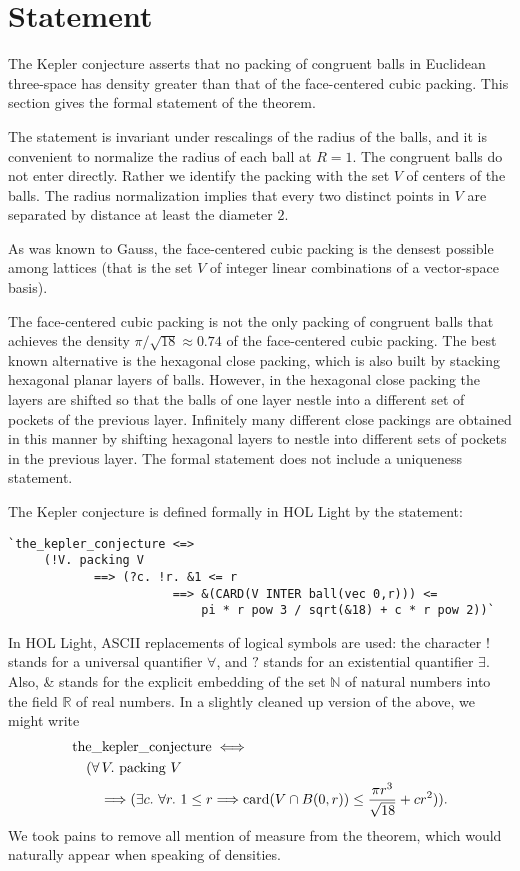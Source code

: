 \documentclass{amsart}
\newcommand{\ring}[1]{\mathbb{#1}}
\newcommand{\op}[1]{\hbox{#1}}
\begin{document}


\section{Statement}

The Kepler conjecture asserts that no packing of congruent balls in
Euclidean three-space has density greater than that of the
face-centered cubic packing.  This section gives the formal statement
of the theorem.

The statement is invariant under rescalings of the radius of the balls,
and it is convenient to normalize the radius of each ball at $R=1$.
The congruent balls do not enter directly. Rather we identify the packing
with the set $V$ of centers of the balls.  The radius normalization implies
that every two distinct points in $V$ are separated by distance at least
the diameter $2$.

As was known to Gauss, the face-centered cubic packing is the densest
possible among lattices (that is the set $V$ of integer linear
combinations of a vector-space basis).

The face-centered cubic packing is not the only packing of congruent
balls that achieves the density $\pi/\sqrt{18} \approx 0.74$ of the
face-centered cubic packing.  The best known alternative is the
hexagonal close packing, which is also built by stacking hexagonal
planar layers of balls.  However, in the hexagonal close packing the
layers are shifted so that the balls of one layer nestle into a different
set of pockets of the previous layer.  Infinitely many different
close packings are obtained in this manner by shifting hexagonal
layers to nestle into different sets of pockets in the previous
layer.  The formal statement does not include a uniqueness statement.

The Kepler conjecture is defined formally in HOL Light by the statement:
\begin{verbatim}
`the_kepler_conjecture <=>
     (!V. packing V
            ==> (?c. !r. &1 <= r
                       ==> &(CARD(V INTER ball(vec 0,r))) <=
                           pi * r pow 3 / sqrt(&18) + c * r pow 2))`
\end{verbatim}
In HOL Light, ASCII replacements of logical symbols are used:
the character $!$ stands for a universal quantifier $\forall$,
and $?$ stands for an existential quantifier $\exists$.
Also, \& stands for the explicit embedding of the set $\ring{N}$ of natural
numbers into the field $\ring{R}$ of real numbers.  In a slightly
cleaned up version of the above, we might write
\begin{align*}
&\op{the\_kepler\_conjecture} \iff\\
&\quad (\forall\, V.\ \op{packing}\ V\\
&\quad\quad \Longrightarrow (\exists c.\ \forall r.\ 1 \le r \Longrightarrow
\op{card}(V \cap B(0,r)) \le
\frac{\pi r^3}{\sqrt{18}} + c r^2)).
\end{align*}
We took pains to remove all mention of measure from the theorem, which
would naturally appear when speaking of densities.
\end{document}
